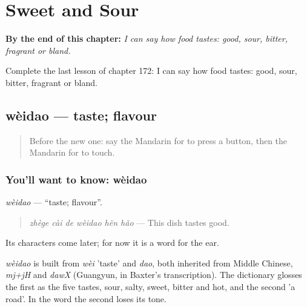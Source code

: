 
\chapter{Sweet and Sour}
\label{ch:zh-sweet-and-sour}

\begin{chapteropening}
\textbf{By the end of this chapter:} \emph{I can say how food tastes: good, sour, bitter, fragrant or bland.}

Complete the last lesson of chapter 172: I can say how food tastes: good, sour, bitter, fragrant or bland.
\end{chapteropening}

\section[wèidao]{wèidao — taste; flavour}

\label{lesson:ZH-C172-weidao}



\begin{quote}
Before the new one: say the Mandarin for to press a button, then the Mandarin for to touch.
\end{quote}

\subsection*{You'll want to know: wèidao}
\emph{wèidao} — \textquotedblleft{}taste; flavour\textquotedblright{}.

\begin{quote}
\emph{zhège cài de wèidao hěn hǎo} — This dish tastes good.
\end{quote}

Its characters come later; for now it is a word for the ear.

\begin{cousinweb}
\emph{wèidao} is built from \emph{wèi} 'taste' and \emph{dao}, both inherited from Middle Chinese, \emph{mj+jH} and \emph{dawX} (Guangyun, in Baxter's transcription). The dictionary glosses the first as the five tastes, sour, salty, sweet, bitter and hot, and the second 'a road'. In the word the second loses its tone.
\end{cousinweb}

